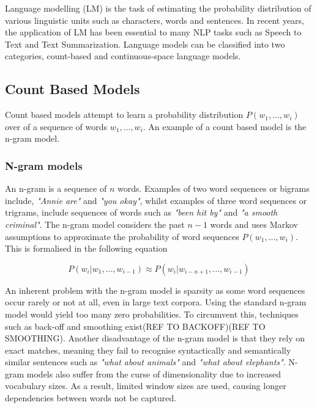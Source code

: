 \noindent
\newline
Language modelling (LM) is the task of estimating the probability distribution of various linguistic units such as characters, words and sentences. In recent years, the application of LM  has been essential to many NLP tasks such as Speech to Text and Text Summarization. Language models can be classified into two categories, count-based and continuous-space language models. 

\subsection{Count Based Models}
Count based models attempt to learn a probability distribution \(P(w_{1},...,w_{i}) \) over of a sequence of words \(w_{1},...,w_{i}\). An example of a count based model is the n-gram model.

\subsubsection{N-gram models}
An n-gram is a sequence of \(n\) words. Examples of two word sequences or bigrams include, \textit{"Annie are"} and \textit{"you okay"}, whilst examples of three word sequences or trigrams, include sequences of words such as \textit{"been hit by"} and \textit{"a smooth criminal"}. The n-gram model considers the past \(n-1\) words and uses Markov assumptions to approximate the probability of word sequences \(P(w_{1},...,w_{i}) \). This is formalised in the following equation

\begin{equation}
	P(w_{i} | w_{1},...,w_{i-1}) \approx P(w_{i} | w_{i-n+1},...,w_{i-1})
\end{equation}

\noindent
\newline
An inherent problem with the n-gram model is sparsity as some word sequences occur rarely or not at all, even in large text corpora. Using the standard n-gram model would yield too many zero probabilities. To circumvent this, techniques such as back-off and smoothing exist(REF TO BACKOFF)(REF TO SMOOTHING). Another disadvantage of the n-gram model is that they rely on exact matches, meaning they fail to recognise syntactically and semantically similar sentences such as \textit{"what about animals"} and \textit{"what about elephants"}. N-gram models also suffer from the curse of dimensionality due to increased vocabulary sizes. As a result, limited window sizes are used, causing longer dependencies between words not be captured.

